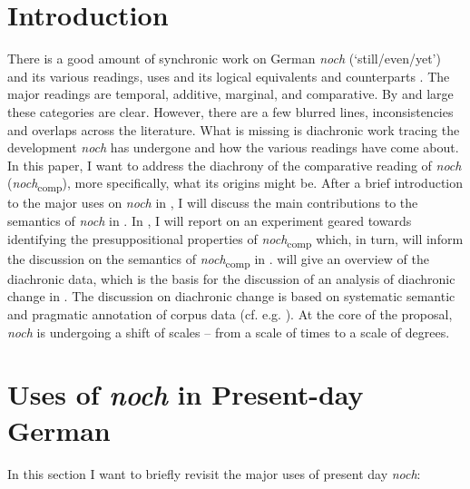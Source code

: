 \documentclass[output=paper]{langsci/langscibook}
\author{Martin Kopf-Giammanco\affiliation{Universität des Saarlandes}}
\begin{document}
\maketitle

\section{Introduction}\label{sec_intro}
There is a good amount of synchronic work on German \textit{noch} (`still/even/yet') and its various readings, uses and its logical equivalents and counterparts \citep[e.g.][]{koenig1977,loebner1989,Ippolito2007,umbach2009a_comp,umbach2009b_add,umbach2012,beck2016a_sub,beck2016b_disc}. The major readings are temporal, additive, marginal, and comparative. By and large these categories are clear. However, there are a few blurred lines, inconsistencies and overlaps across the literature. What is missing is diachronic work tracing the development \textit{noch} has undergone and how the various readings have come about. In this paper, I want to address the diachrony of the comparative reading of \textit{noch} (\textit{noch}\textsubscript{comp}), more specifically, what its origins might be. After a brief introduction to the major uses on \textit{noch} in , I will discuss the main contributions to the semantics of \textit{noch} in . In , I will report on an experiment geared towards identifying the presuppositional properties of \textit{noch}\textsubscript{comp} which, in turn, will inform the discussion on the semantics of \textit{noch}\textsubscript{comp} in .  will give an overview of the diachronic data, which is the basis for the discussion of an analysis of diachronic change in . The discussion on diachronic change is based on systematic semantic and pragmatic annotation of corpus data (cf. e.g. \citealt{gergel_kopf-giammanco_watkins_2017,gergel_bluemel_kopf_2016,gergel_etal_2017}). At the core of the proposal, \textit{noch} is undergoing a shift of scales -- from a scale of times to a scale of degrees.

\section{Uses of \textit{noch} in Present-day German} \label{sec_major_readings}

In this section I want to briefly revisit the major uses of present day \textit{noch}:
\end{document}
